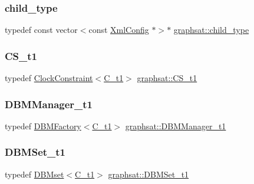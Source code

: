 \mbox{\label{namespacegraphsat_aba2f5cf076d49898cc0469bee94d3a05}} 
\subsubsection{\texorpdfstring{child\_type}{child\_type}}
{\footnotesize\ttfamily typedef const vector$<$const \mbox{\hyperlink{classgraphsat_1_1_xml_config}{Xml\+Config}} $\ast$$>$$\ast$ \mbox{\hyperlink{namespacegraphsat_aba2f5cf076d49898cc0469bee94d3a05}{graphsat\+::child\+\_\+type}}}

\mbox{\label{namespacegraphsat_a6a55464bf94f0ab98539fd8c3b66c603}} 
\subsubsection{\texorpdfstring{CS\_t1}{CS\_t1}}
{\footnotesize\ttfamily typedef \mbox{\hyperlink{classgraphsat_1_1_clock_constraint}{Clock\+Constraint}}$<$\mbox{\hyperlink{namespacegraphsat_af82e57b58a5af8441762469b70c475da}{C\+\_\+t1}}$>$ \mbox{\hyperlink{namespacegraphsat_a6a55464bf94f0ab98539fd8c3b66c603}{graphsat\+::\+C\+S\+\_\+t1}}}

\mbox{\label{namespacegraphsat_abe6691ac6002381e0250076f52d17b09}} 
\subsubsection{\texorpdfstring{DBMManager\_t1}{DBMManager\_t1}}
{\footnotesize\ttfamily typedef \mbox{\hyperlink{classgraphsat_1_1_d_b_m_factory}{D\+B\+M\+Factory}}$<$\mbox{\hyperlink{namespacegraphsat_af82e57b58a5af8441762469b70c475da}{C\+\_\+t1}}$>$ \mbox{\hyperlink{namespacegraphsat_abe6691ac6002381e0250076f52d17b09}{graphsat\+::\+D\+B\+M\+Manager\+\_\+t1}}}

\mbox{\label{namespacegraphsat_aef99081ea3cfd071bce1daf003acde8d}} 
\subsubsection{\texorpdfstring{DBMSet\_t1}{DBMSet\_t1}}
{\footnotesize\ttfamily typedef \mbox{\hyperlink{classgraphsat_1_1_d_b_mset}{D\+B\+Mset}}$<$\mbox{\hyperlink{namespacegraphsat_af82e57b58a5af8441762469b70c475da}{C\+\_\+t1}}$>$ \mbox{\hyperlink{namespacegraphsat_aef99081ea3cfd071bce1daf003acde8d}{graphsat\+::\+D\+B\+M\+Set\+\_\+t1}}}

